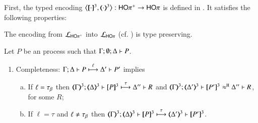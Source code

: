 \documentclass[runningheads]{llncs}
\begin{document}
{%
First, the typed encoding
$\enco{\map{\cdot}^{3}, \mapt{\cdot}^{3}}: \HOpp \to \HOp$ is defined
in .
It satisfies the following properties:
{
\begin{proposition}
The encoding from $\mathcal{L}_{\mathsf{HO\pi^{+}}}$ into $\mathcal{L}_{\mathsf{HO}\pi}$ (cf. )
is type preserving.
\end{proposition}}


\begin{proposition} %
	\label{prop:op_corr_HOpp_to_HOp}
	Let $P$ be an \HOpp process such that $\Gamma; \emptyset; \Delta \vdash P$.
	\begin{enumerate}[1.]
		\item	Completeness: 
			$\Gamma; \Delta \vdash P \stackrel{\ell}{\longmapsto} \Delta' \vdash P'$ implies
			\begin{enumerate}[a)]
%
				\item	If $\ell = \tau_{\beta}$ then
					$\horel{\tmap{\Gamma}{3}}{\tmap{\Delta}{3}}{\pmap{P}{3}}{\hby{\tau}}
					{\Delta''}{R}$ and
					$\horel{\tmap{\Gamma}{3}}{\tmap{\Delta'}{3}}{\pmap{P'}{3}}{\hwb}{\Delta''}{R}$, for some $R$;

				\item	If $\ell = \tau$ and $\ell \not= \tau_{\beta}$ then %
					$\horel{\tmap{\Gamma}{3}}{\tmap{\Delta}{3}}{\pmap{P}{3}}{\hby{\tau}}
					{\tmap{\Delta'}{3}}{\pmap{P'}{3}}$.
			\end{enumerate}


\end{enumerate}
\end{proposition}}
\end{document}
